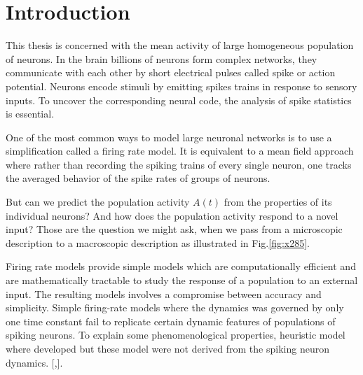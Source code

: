 \documentclass[12pt,twoside]{report}
\begin{document}
\clearpage\newpage\null\thispagestyle{empty}\newpage


\tableofcontents
\thispagestyle{empty}


\newpage\null\thispagestyle{empty}\newpage




\chapter{Introduction}
\setcounter{page}{1}

\label{sec:intro}


This thesis is concerned with the mean activity of large homogeneous population of neurons. In the brain billions of neurons form complex networks, they communicate with each other by short electrical pulses called spike or action potential. Neurons encode stimuli by emitting spikes trains in response to sensory inputs. To uncover the corresponding neural code, the analysis of spike statistics is essential. 

One of the most common ways to model large neuronal networks is to use a simplification called a firing rate model. It is equivalent to a mean field approach where rather than recording the spiking trains of every single neuron, one tracks the averaged behavior of the spike rates of groups of neurons.

But can we predict the population activity $A(t)$ from the properties of its individual neurons? And how does the population activity respond to a novel input? Those are the question we might ask, when we pass from a microscopic description to a macroscopic description as illustrated in Fig.\ref{fig:x285}.

 Firing rate models provide simple models which are computationally efficient and are mathematically tractable to study the response of a population to an external input. The resulting models involves a compromise between accuracy and simplicity. Simple firing-rate models where the dynamics was governed by only one time constant fail to replicate certain dynamic features of populations of spiking neurons. To explain some phenomenological properties, heuristic model where developed but these model were not derived from the spiking neuron dynamics. [\cite{WilCow72},\cite{OstBru11}]. 
\end{document}

